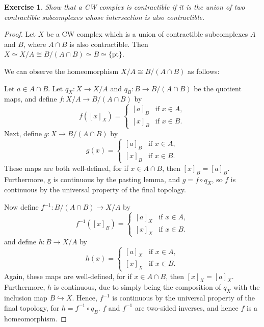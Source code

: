 \documentclass{article}
\newtheorem{exercise}[theorem]{Exercise}
\begin{document}
\begin{exercise}
Show that a CW complex is contractible if it is the union of two contractible subcomplexes whose intersection is also contractible.
\end{exercise}
\begin{proof}
Let $X$ be a CW complex which is a union of contractible subcomplexes $A$ and $B$, where $A\cap B$ is also contractible. Then $X\simeq X/A\cong B/(A\cap B)\simeq B\simeq\{\text{pt}\}$.

\noindent We can observe the homeomorphism $X/A\cong B/(A\cap B)$ as follows:

Let $a\in A\cap B$. Let $q_X:X\to X/A$ and $q_B:B\to B/(A\cap B)$ be the quotient maps, and define $f:X/A\to B/(A\cap B)$ by\[f([x]_X)=\begin{cases}
    [a]_B&\text{if }x\in A,\\
    [x]_B&\text{if }x\in B.
\end{cases}\] Next, define $g:X\to B/(A\cap B)$ by\[g(x)=\begin{cases}
    [a]_B&\text{if }x\in A,\\
    [x]_B&\text{if }x\in B.
\end{cases}\]These maps are both well-defined, for if $x\in A\cap B$, then $[x]_B=[a]_B$. Furthermore, g is continuous by the pasting lemma, and $g=f\circ q_X$, so $f$ is continuous by the universal property of the final topology.

Now define $f^{-1}:B/(A\cap B)\to X/A$ by\[f^{-1}([x]_B)=\begin{cases}
    [a]_X&\text{if }x\in A,\\
    [x]_X&\text{if }x\in B.
\end{cases}\]and define $h:B\to X/A$ by\[h(x)=\begin{cases}
    [a]_X&\text{if }x\in A,\\
    [x]_X&\text{if }x\in B.
\end{cases}\]Again, these maps are well-defined, for if $x\in A\cap B$, then $[x]_X=[a]_X$. Furthermore, $h$ is continuous, due to simply being the composition of $q_X$ with the inclusion map $B\hookrightarrow X$. Hence, $f^{-1}$ is continuous by the universal property of the final topology, for $h=f^{-1}\circ q_B$. $f$ and $f^{-1}$ are two-sided inverses, and hence $f$ is a homeomorphism.
\end{proof}
\end{document}
